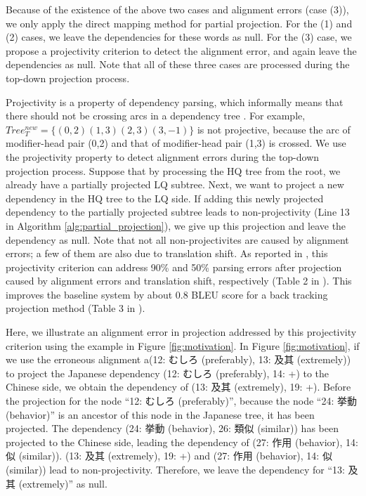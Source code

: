 \documentclass[english]{jnlp_1.4}
\begin{document}
Because of the existence of the above {two cases and alignment errors (case (3))}, we only 
apply the direct mapping method for partial projection. For the (1) and (2) cases, we leave the dependencies
for these words as null. For the (3) case, we propose a projectivity criterion to detect 
the alignment error, and again leave the dependencies as null. Note that all of these three
cases are processed during the top-down projection process.

Projectivity is a property of dependency parsing, which informally means that there should 
not be crossing arcs in a dependency tree \cite{Kubler:2009:DP:1538443}. For example, 
$Tree_T^{new}=\{(0,2) (1,3) (2,3) (3,-1)\}$ is not projective, because 
the arc of modifier-head pair (0,2) and that of modifier-head pair (1,3) is crossed. We use
the projectivity property to detect alignment errors during the top-down projection 
process. Suppose that by processing the HQ tree from the root, we already have a partially projected LQ subtree.
Next, we want to project a new dependency in the HQ tree to the LQ side. If adding this newly 
projected dependency to the partially projected subtree leads to 
non-projectivity {(Line {13} in Algorithm \ref{alg:partial_projection})}, we give up this projection and leave the dependency as null.
{Note that not all non-projectivites are caused by alignment errors;
a few of them are also due to translation shift. As reported in \cite{Shen2015a},
this projectivity criterion can address 90\% and 50\% parsing errors after projection 
caused by alignment errors and translation shift, respectively (Table 2 in \cite{Shen2015a}).
This improves the baseline system by about 0.8 BLEU score for a back tracking projection method
(Table 3 in \cite{Shen2015a}).}

{Here, we illustrate an alignment error in projection addressed by 
this projectivity criterion using the example in Figure \ref{fig:motivation}.}
In Figure \ref{fig:motivation}, if we use the erroneous alignment a(12: むしろ (preferably), 13: 及其 (extremely))
to project the Japanese dependency (12: むしろ (preferably), 14: +) to the Chinese side, we
obtain the dependency of (13: 及其 (extremely), 19: +).
Before the projection for the node ``12: むしろ (preferably)'', because the node ``24: 挙動 (behavior)'' 
is an ancestor of this node in the Japanese tree, it has been projected. The dependency (24: 挙動 (behavior), 
26: 類似 (similar)) has been projected to the Chinese side, leading
the dependency of (27: 作用 (behavior), 14: 似 (similar)). (13: 及其 (extremely), 19: +) and
(27: 作用 (behavior), 14: 似 (similar)) lead to non-projectivity. Therefore, we leave
the dependency for ``13: 及其 (extremely)'' as null.
\end{document}
